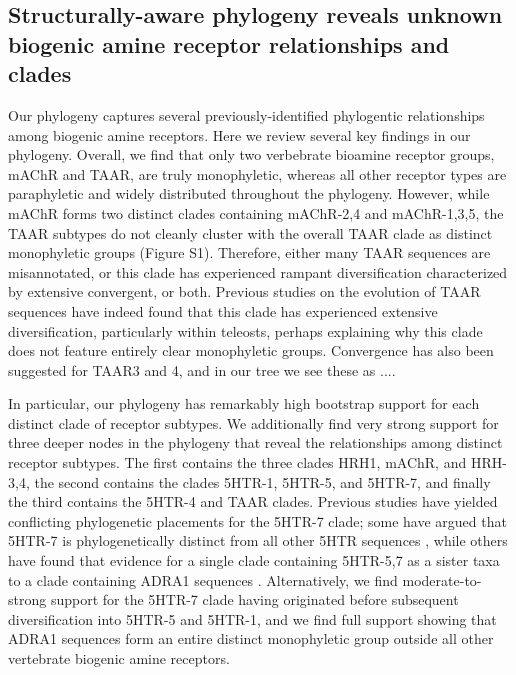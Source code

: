 \documentclass[fleqn,10pt]{wlpeerj}
\begin{document}
\subsection*{Structurally-aware phylogeny reveals unknown biogenic amine receptor relationships and clades}

Our phylogeny captures several previously-identified phylogentic relationships among biogenic amine receptors. Here we review several key findings in our phylogeny. Overall, we find that only two verbebrate bioamine receptor groups, mAChR and TAAR, are truly monophyletic, whereas all other receptor types are paraphyletic and widely distributed throughout the phylogeny. However, while mAChR forms two distinct clades containing mAChR-2,4 and mAChR-1,3,5, the TAAR subtypes do not cleanly cluster with the overall TAAR clade as distinct monophyletic groups (Figure S1). Therefore, either many TAAR sequences are misannotated, or this clade has experienced rampant diversification characterized by extensive convergent, or both. Previous studies on the evolution of TAAR sequences have indeed found that this clade has experienced extensive diversification, particularly within teleosts, perhaps explaining why this clade does not feature entirely clear monophyletic groups. Convergence has also been suggested for TAAR3 and 4, and in our tree we see these as ....


In particular, our phylogeny has remarkably high bootstrap support for each distinct clade of receptor subtypes. We additionally find very strong support for three deeper nodes in the phylogeny that reveal the relationships among distinct receptor subtypes. The first contains the three clades HRH1, mAChR, and HRH-3,4, the second contains the clades 5HTR-1, 5HTR-5, and 5HTR-7, and finally the third contains the 5HTR-4 and TAAR clades. Previous studies have yielded conflicting phylogenetic placements for the 5HTR-7 clade; some have argued that 5HTR-7 is phylogenetically distinct from all other 5HTR sequences \citep{KakaralaJamil2014}, while others have found that evidence for a single clade containing 5HTR-5,7 as a sister taxa to a clade containing ADRA1 sequences \citep{Fredrikssonetal2003}. Alternatively, we find moderate-to-strong support for the 5HTR-7 clade having originated before subsequent diversification into 5HTR-5 and 5HTR-1, and we find full support showing that ADRA1 sequences form an entire distinct monophyletic group outside all other vertebrate biogenic amine receptors.
\end{document}
